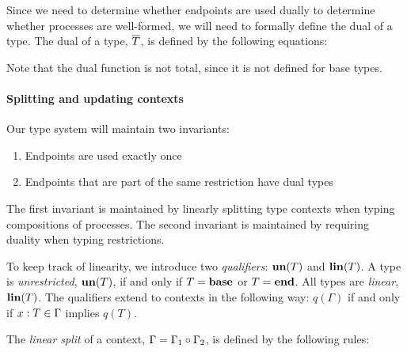 Since we need to determine whether endpoints are used dually to determine whether processes are well-formed, we will need to formally define the dual of a type.
The dual of a type, \( \overline{T} \), is defined by the following equations:
Note that the dual function is not total, since it is not defined for base types.

\paragraph{Splitting and updating contexts}
Our type system will maintain two invariants:
\begin{enumerate}
\item Endpoints are used exactly once
\item Endpoints that are part of the same restriction have dual types
\end{enumerate}
The first invariant is maintained by linearly splitting type contexts when typing compositions of processes.
The second invariant is maintained by requiring duality when typing restrictions.

To keep track of linearity, we introduce two \emph{qualifiers}: \( \mathbf{un}(T) \) and \( \mathbf{lin}(T) \).
A type is \emph{unrestricted}, \( \mathbf{un}(T) \), if and only if \( T = \mathbf{base} \) or \( T = \mathbf{end} \).
All types are \emph{linear}, \( \mathbf{lin}(T) \).
The qualifiers extend to contexts in the following way: \( q(\Gamma) \) if and only if \( x : T \in \Gamma \) implies \( q(T) \).

The \emph{linear split} of a context, \( \Gamma = \Gamma_1 \circ \Gamma_2 \), is defined by the following rules:

